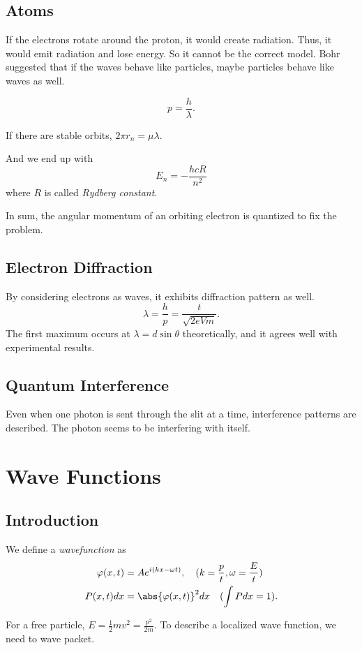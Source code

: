 \subsection{Atoms}
If the electrons rotate around the proton, it would create radiation. Thus, it would emit radiation and lose energy. So it cannot be the correct model. Bohr suggested that if the waves behave like particles, maybe particles behave like waves as well.

\[
    p = \frac{h}{\lambda}.
\]

If there are stable orbits, \(2\pi r_n = \mu \lambda\).

And we end up with
\[
    E_n = -\frac{hcR}{n^2}
\]
where \(R\) is called \textit{Rydberg constant}.

In sum, the angular momentum of an orbiting electron is quantized to fix the problem.

\subsection{Electron Diffraction}
By considering electrons as waves, it exhibits diffraction pattern as well.
\[
    \lambda = \frac{h}{p} = \frac{t}{\sqrt{2eVm} }.
\]
The first maximum occurs at \(\lambda = d \sin \theta\) theoretically, and it agrees well with experimental results.

\subsection{Quantum Interference}
Even when one photon is sent through the slit at a time, interference patterns are described. The photon seems to be interfering with itself.

\section{Wave Functions}
\subsection{Introduction}
\leavevmode
\begin{definition}{}{}
    We define a \textit{wavefunction} as
    \begin{align*}
        \varphi(x, t) &= A e^{i(kx - \omega t)},\quad (k = \frac{p}{t}, \omega = \frac{E}{t})\\
        P(x,t)dx &= \abs{\varphi(x,t)} ^2 dx \quad (\int P dx = 1).
    \end{align*}
\end{definition}
For a free particle, \(E = \frac{1}{2} mv^2 = \frac{p^2}{2m}\). To describe a localized wave function, we need to wave packet.